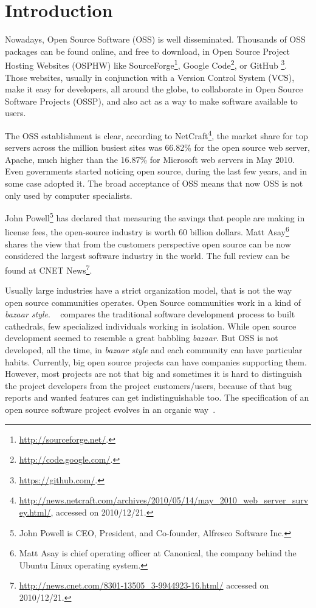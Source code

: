 \thispagestyle{empty}
\chapter{Introduction}\label{chap:introduction}


Nowadays, Open Source Software (OSS) is well disseminated.
Thousands of OSS packages can be found online, and free to download,
in Open Source Project Hosting Websites (OSPHW) like
\textsf{SourceForge}\footnote{\url{http://sourceforge.net/}.},
\textsf{Google Code}\footnote{\url{http://code.google.com/}.}, or
\textsf{GitHub     }\footnote{\url{https://github.com/}.}.
Those websites, usually in conjunction with a Version Control System (VCS), make it easy for developers, all around the globe,
to collaborate in Open Source Software Projects (OSSP), and also act as a way to make software available to users.

The OSS establishment is clear,
according to \textsf{NetCraft}\footnote{\url{http://news.netcraft.com/archives/2010/05/14/may\_2010\_web\_server\_survey.html/}, accessed on 2010/12/21.},
the market share for top servers across the million busiest sites was 66.82\% for the open source web server, Apache,
much higher than the 16.87\% for Microsoft web servers in May 2010.
Even governments started noticing open source, during the last few years, and in some case adopted it\cite{hahn2002government}.
The broad acceptance of OSS means that now OSS is not only used by computer specialists.

\textsf{John Powell}\footnote{John Powell is CEO, President, and Co-founder, Alfresco Software Inc.}
has declared that measuring the savings that people are making in license fees, the open-source industry is worth 60 billion dollars.
\textsf{Matt Asay}\footnote{Matt Asay is chief operating officer at Canonical, the company behind the Ubuntu Linux operating system.}
shares the view that from the customers perspective open source can be now considered the largest software industry in the world.
The full review can be found at \textsf{CNET News}\footnote{\url{http://news.cnet.com/8301-13505\_3-9944923-16.html/} accessed on 2010/12/21.}.

Usually large industries have a strict organization model, that is not the way open source communities operates.
Open Source communities work in a kind of \textit{bazaar style}.
~\cite{raymondcathedral} compares the traditional software development process to built cathedrals,
few specialized individuals working in isolation.
While open source development seemed to resemble a great babbling \textit{bazaar}.
But OSS is not developed, all the time, in \textit{bazaar style} and each community can have particular habits.
Currently, big open source projects can have companies supporting them.
However, most projects are not that big and sometimes it is hard to distinguish the project developers from the project customers/users,
because of that bug reports and wanted features can get indistinguishable too.
The specification of an open source software project evolves in an organic way~\cite{capiluppicathedral}.

